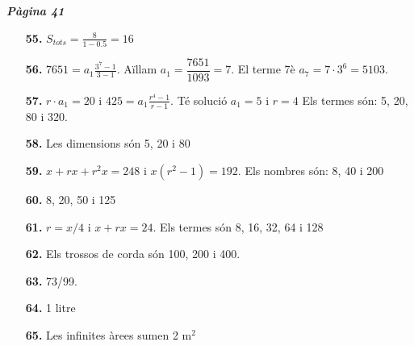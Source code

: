 \documentclass[a4paper, pdf, twoside]{book}
\begin{document}
\begin{multicols}{2}

{\textbf{\em Pàgina 41}} \hrulefill
\begin{enumerate}
\vspace{0.25cm}
\item[\fontfamily{phv}\selectfont\color{blue}\textbf{55. }] 
$S_{tots}=\frac {8}{1-0.5}=16$
 \end{enumerate}
\begin{enumerate}
\vspace{0.25cm}
\item[\fontfamily{phv}\selectfont\color{blue}\textbf{56. }] 
$7651=a_1\frac {3^7-1}{3-1}$. Aïllam $a_1=\dfrac {7651}{1093}=7$. El terme 7è $a_7=7\cdot 3^6=5103$.
\vspace{0.25cm}
\item[\fontfamily{phv}\selectfont\color{blue}\textbf{57. }] 
$r \cdot a_1=20$ i $425=a_1\frac {r^4-1}{r-1}$. Té solució $a_1=5$ i $r=4$ Els termes són: 5, 20, 80 i 320.
\vspace{0.25cm}
\item[\fontfamily{phv}\selectfont\color{blue}\textbf{58. }] 
Les dimensions són 5, 20 i 80
\vspace{0.25cm}
\item[\fontfamily{phv}\selectfont\color{blue}\textbf{59. }] 
$x+rx+r^2x=248$ i $x(r^2-1)=192$. Els nombres són: 8, 40 i 200
\vspace{0.25cm}
\item[\fontfamily{phv}\selectfont\color{blue}\textbf{60. }] 
8, 20, 50 i 125
\vspace{0.25cm}
\item[\fontfamily{phv}\selectfont\color{blue}\textbf{61. }] 
$r=x/4$ i $x+rx=24$. Els termes són 8, 16, 32, 64 i 128
\vspace{0.25cm}
\item[\fontfamily{phv}\selectfont\color{blue}\textbf{62. }] 
Els trossos de corda són 100, 200 i 400.
\vspace{0.25cm}
\item[\fontfamily{phv}\selectfont\color{blue}\textbf{63. }] 
73/99.
\vspace{0.25cm}
\item[\fontfamily{phv}\selectfont\color{blue}\textbf{64. }] 
1 litre
\vspace{0.25cm}
\item[\fontfamily{phv}\selectfont\color{blue}\textbf{65. }] 
Les infinites àrees sumen 2 m$^2$
\vspace{0.25cm}




\end{enumerate}
\end{multicols}
\end{document}
